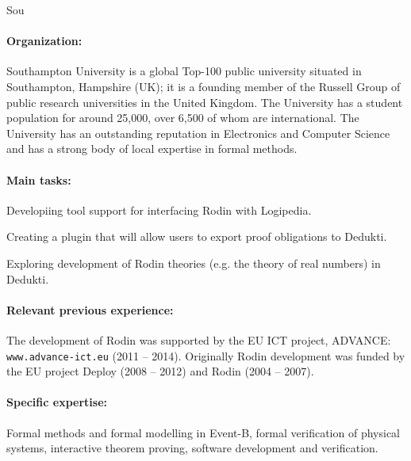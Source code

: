 \begin{sitedescription}{Sou}

\paragraph*{Organization:}
Southampton University is a global Top-100 public university situated in Southampton, Hampshire (UK); it is a founding member of the Russell Group of public research universities in the United Kingdom. The University has a student population for around 25,000, over 6,500 of whom are international. The University has an outstanding reputation in Electronics and Computer Science and has a strong body of local expertise in formal methods.

\paragraph*{Main tasks:}
\begin{compactitem}
\item Developiing tool support for interfacing Rodin with Logipedia.  
\item Creating a plugin that will allow users to export proof obligations to Dedukti.
\item Exploring development of Rodin theories (e.g. the theory of real numbers) in Dedukti.
\end{compactitem}


\paragraph*{Relevant previous experience:}
The development of Rodin was supported by the EU ICT project, ADVANCE: \texttt{www.advance-ict.eu} (2011 -- 2014). Originally Rodin development was funded by the EU project Deploy (2008 -- 2012) and Rodin (2004 -- 2007).

\paragraph*{Specific expertise:}
Formal methods and formal modelling in Event-B, formal verification of physical systems, interactive theorem proving, software development and verification.


\end{sitedescription}
